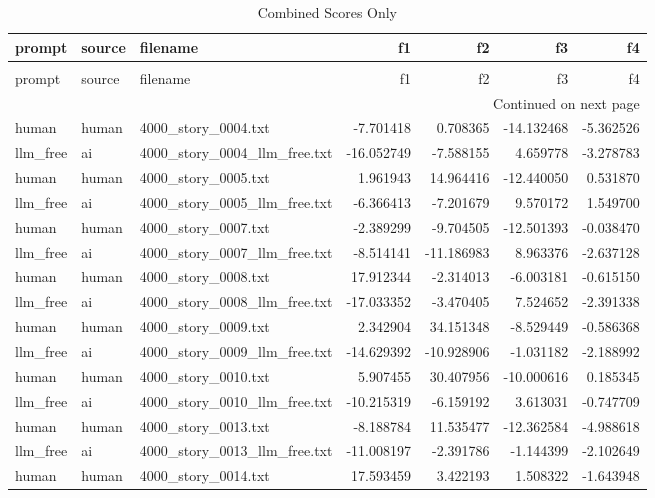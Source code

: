 \begin{longtable}{lllrrrr}
\caption{Combined Scores Only} \label{tab:cl-st1-ph2-sara-scores-only} \\
\toprule
prompt & source & filename & f1 & f2 & f3 & f4 \\
\midrule
\endfirsthead
\caption[]{Combined Scores Only} \\
\toprule
prompt & source & filename & f1 & f2 & f3 & f4 \\
\midrule
\endhead
\midrule
\multicolumn{7}{r}{Continued on next page} \\
\midrule
\endfoot
\bottomrule
\endlastfoot
human & human & 4000\_story\_0004.txt & -7.701418 & 0.708365 & -14.132468 & -5.362526 \\
llm\_free & ai & 4000\_story\_0004\_llm\_free.txt & -16.052749 & -7.588155 & 4.659778 & -3.278783 \\
human & human & 4000\_story\_0005.txt & 1.961943 & 14.964416 & -12.440050 & 0.531870 \\
llm\_free & ai & 4000\_story\_0005\_llm\_free.txt & -6.366413 & -7.201679 & 9.570172 & 1.549700 \\
human & human & 4000\_story\_0007.txt & -2.389299 & -9.704505 & -12.501393 & -0.038470 \\
llm\_free & ai & 4000\_story\_0007\_llm\_free.txt & -8.514141 & -11.186983 & 8.963376 & -2.637128 \\
human & human & 4000\_story\_0008.txt & 17.912344 & -2.314013 & -6.003181 & -0.615150 \\
llm\_free & ai & 4000\_story\_0008\_llm\_free.txt & -17.033352 & -3.470405 & 7.524652 & -2.391338 \\
human & human & 4000\_story\_0009.txt & 2.342904 & 34.151348 & -8.529449 & -0.586368 \\
llm\_free & ai & 4000\_story\_0009\_llm\_free.txt & -14.629392 & -10.928906 & -1.031182 & -2.188992 \\
human & human & 4000\_story\_0010.txt & 5.907455 & 30.407956 & -10.000616 & 0.185345 \\
llm\_free & ai & 4000\_story\_0010\_llm\_free.txt & -10.215319 & -6.159192 & 3.613031 & -0.747709 \\
human & human & 4000\_story\_0013.txt & -8.188784 & 11.535477 & -12.362584 & -4.988618 \\
llm\_free & ai & 4000\_story\_0013\_llm\_free.txt & -11.008197 & -2.391786 & -1.144399 & -2.102649 \\
human & human & 4000\_story\_0014.txt & 17.593459 & 3.422193 & 1.508322 & -1.643948 \\

\end{longtable}
